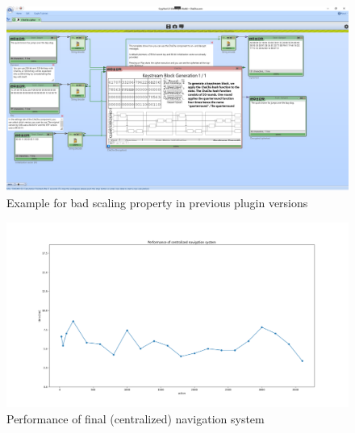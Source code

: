 \begin{figure}
\centering
\includegraphics[width=\textwidth]{figures/ct2/scaling-bug-example.png}
\caption{Example for bad scaling property in previous plugin versions}
\label{fig:plugin.scaling.bug}
\end{figure}

\begin{figure}
\centering
\includegraphics[width=\textwidth]{figures/pyplot/performance_navsystem-central.png}
\caption{Performance of final (centralized) navigation system}
\label{fig:navsystem.performance.central}
\end{figure}

